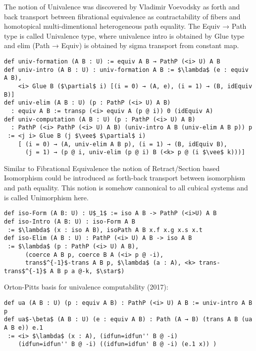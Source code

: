 \documentclass{article}
\begin{document}
The notion of Univalence was discovered by Vladimir Voevodsky
as forth and back transport between fibrational equivalence
as contractability of fibers and homotopical multi-dimentional
heterogeneous path equality. The Equiv → Path type is called Univalence type,
where univalence intro is obtained by Glue type and elim (Path → Equiv) is
obtained by sigma transport from constant map.

\begin{lstlisting}[mathescape=true]
def univ-formation (A B : U) := equiv A B → PathP (<i> U) A B
def univ-intro (A B : U) : univ-formation A B := $\lambda$ (e : equiv A B),
    <i> Glue B ($\partial$ i) [(i = 0) → (A, e), (i = 1) → (B, idEquiv B)]
def univ-elim (A B : U) (p : PathP (<i> U) A B)
  : equiv A B := transp (<i> equiv A (p @ i)) 0 (idEquiv A)
def univ-computation (A B : U) (p : PathP (<i> U) A B)
  : PathP (<i> PathP (<i> U) A B) (univ-intro A B (univ-elim A B p)) p
 := <j i> Glue B (j $\vee$ $\partial$ i)
    [ (i = 0) → (A, univ-elim A B p), (i = 1) → (B, idEquiv B),
      (j = 1) → (p @ i, univ-elim (p @ i) B (<k> p @ (i $\vee$ k)))]
\end{lstlisting}

Similar to Fibrational Equivalence the notion of Retract/Section based Isomorphism could be introduced
as forth-back transport between isomorphism and path equality. This notion is somehow cannonical to all
cubical systems and is called Unimorphism here.

\begin{lstlisting}[mathescape=true]
def iso-Form (A B: U) : U$_1$ := iso A B -> PathP (<i>U) A B
def iso-Intro (A B: U) : iso-Form A B
 := $\lambda$ (x : iso A B), isoPath A B x.f x.g x.s x.t
def iso-Elim (A B : U) : PathP (<i> U) A B -> iso A B
 := $\lambda$ (p : PathP (<i> U) A B),
      (coerce A B p, coerce B A (<i> p @ -i),
      trans$^{-1}$-trans A B p, $\lambda$ (a : A), <k> trans-trans$^{-1}$ A B p a @-k, $\star$)
\end{lstlisting}

Orton-Pitts basis for univalence computability (2017):

\begin{lstlisting}[mathescape=true]
def ua (A B : U) (p : equiv A B) : PathP (<i> U) A B := univ-intro A B p
def ua$-\beta$ (A B : U) (e : equiv A B) : Path (A → B) (trans A B (ua A B e)) e.1
 := <i> $\lambda$ (x : A), (idfun=idfun'' B @ -i)
    (idfun=idfun'' B @ -i) ((idfun=idfun' B @ -i) (e.1 x)) )
\end{lstlisting}
\end{document}
